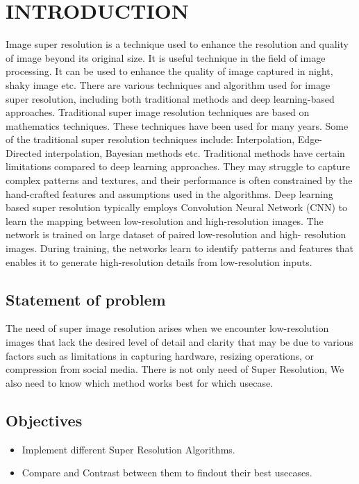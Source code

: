 \newpage
{}
\section{INTRODUCTION}
Image super resolution is a technique used to enhance the resolution and quality of
image beyond its original size. It is useful technique in the field of image processing. It
can be used to enhance the quality of image captured in night, shaky image etc. There
are various techniques and algorithm used for image super resolution, including both
traditional methods and deep learning-based approaches. Traditional super image
resolution techniques are based on mathematics techniques. These techniques have
been used for many years. Some of the traditional super resolution techniques include:
Interpolation, Edge-Directed interpolation, Bayesian methods etc. Traditional methods
have certain limitations compared to deep learning approaches. They may struggle to
capture complex patterns and textures, and their performance is often constrained by
the hand-crafted features and assumptions used in the algorithms.
Deep learning based super resolution typically employs Convolution Neural
Network (CNN) to learn the mapping between low-resolution and high-resolution
images. The network is trained on large dataset of paired low-resolution and high-
resolution images. During training, the networks learn to identify patterns and features
that enables it to generate high-resolution details from low-resolution inputs.


\subsection{Statement of problem}
The need of super image resolution arises when we encounter low-resolution images
that lack the desired level of detail and clarity that may be due to various factors such as limitations in capturing hardware, resizing
operations, or compression from social media. There is not only need of Super Resolution, We also need to know which method works best for which usecase.

\subsection{Objectives} 
\begin{itemize}
    \item Implement different Super Resolution Algorithms.
    \item Compare and Contrast between them to findout their best usecases.
\end{itemize}

